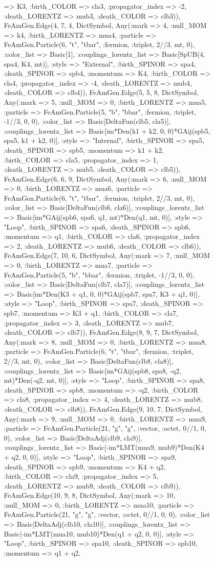 \documentclass{revtex4}
\begin{document}
\begin{figure}[!htb]
\begin{center}
{=> K3, :birth_COLOR => cla3, :propagator_index => -2, :death_LORENTZ => mub3, :death_COLOR => clb3)), FeAmGen.Edge(4, 7, 4, Dict{Symbol, Any}(:mark => 4, :null_MOM => k4, :birth_LORENTZ => mua4, :particle => FeAmGen.Particle(6, "t", "tbar", :fermion, :triplet, 2//3, mt, 0), :color_list => Basic[1], :couplings_lorentz_list => Basic[SpUB(4, spa4, K4, mt)], :style => "External", :birth_SPINOR => spa4, :death_SPINOR => spb4, :momentum => K4, :birth_COLOR => cla4, :propagator_index => -4, :death_LORENTZ => mub4, :death_COLOR => clb4)), FeAmGen.Edge(5, 5, 8, Dict{Symbol, Any}(:mark => 5, :null_MOM => 0, :birth_LORENTZ => mua5, :particle => FeAmGen.Particle(5, "b", "bbar", :fermion, :triplet, -1//3, 0, 0), :color_list => Basic[DeltaFun(clb5, cla5)], :couplings_lorentz_list => Basic[im*Den(k1 + k2, 0, 0)*GAij(spb5, spa5, k1 + k2, 0)], :style => "Internal", :birth_SPINOR => spa5, :death_SPINOR => spb5, :momentum => k1 + k2, :birth_COLOR => cla5, :propagator_index => 1, :death_LORENTZ => mub5, :death_COLOR => clb5)), FeAmGen.Edge(6, 6, 9, Dict{Symbol, Any}(:mark => 6, :null_MOM => 0, :birth_LORENTZ => mua6, :particle => FeAmGen.Particle(6, "t", "tbar", :fermion, :triplet, 2//3, mt, 0), :color_list => Basic[DeltaFun(clb6, cla6)], :couplings_lorentz_list => Basic[im*GAij(spb6, spa6, q1, mt)*Den(q1, mt, 0)], :style => "Loop", :birth_SPINOR => spa6, :death_SPINOR => spb6, :momentum => q1, :birth_COLOR => cla6, :propagator_index => 2, :death_LORENTZ => mub6, :death_COLOR => clb6)), FeAmGen.Edge(7, 10, 6, Dict{Symbol, Any}(:mark => 7, :null_MOM => 0, :birth_LORENTZ => mua7, :particle => FeAmGen.Particle(5, "b", "bbar", :fermion, :triplet, -1//3, 0, 0), :color_list => Basic[DeltaFun(clb7, cla7)], :couplings_lorentz_list => Basic[im*Den(K3 + q1, 0, 0)*GAij(spb7, spa7, K3 + q1, 0)], :style => "Loop", :birth_SPINOR => spa7, :death_SPINOR => spb7, :momentum => K3 + q1, :birth_COLOR => cla7, :propagator_index => 3, :death_LORENTZ => mub7, :death_COLOR => clb7)), FeAmGen.Edge(8, 9, 7, Dict{Symbol, Any}(:mark => 8, :null_MOM => 0, :birth_LORENTZ => mua8, :particle => FeAmGen.Particle(6, "t", "tbar", :fermion, :triplet, 2//3, mt, 0), :color_list => Basic[DeltaFun(clb8, cla8)], :couplings_lorentz_list => Basic[im*GAij(spb8, spa8, -q2, mt)*Den(-q2, mt, 0)], :style => "Loop", :birth_SPINOR => spa8, :death_SPINOR => spb8, :momentum => -q2, :birth_COLOR => cla8, :propagator_index => 4, :death_LORENTZ => mub8, :death_COLOR => clb8)), FeAmGen.Edge(9, 10, 7, Dict{Symbol, Any}(:mark => 9, :null_MOM => 0, :birth_LORENTZ => mua9, :particle => FeAmGen.Particle(21, "g", "g", :vector, :octet, 0//1, 0, 0), :color_list => Basic[DeltaAdj(clb9, cla9)], :couplings_lorentz_list => Basic[-im*LMT(mua9, mub9)*Den(K4 + q2, 0, 0)], :style => "Loop", :birth_SPINOR => spa9, :death_SPINOR => spb9, :momentum => K4 + q2, :birth_COLOR => cla9, :propagator_index => 5, :death_LORENTZ => mub9, :death_COLOR => clb9)), FeAmGen.Edge(10, 9, 8, Dict{Symbol, Any}(:mark => 10, :null_MOM => 0, :birth_LORENTZ => mua10, :particle => FeAmGen.Particle(21, "g", "g", :vector, :octet, 0//1, 0, 0), :color_list => Basic[DeltaAdj(clb10, cla10)], :couplings_lorentz_list => Basic[-im*LMT(mua10, mub10)*Den(q1 + q2, 0, 0)], :style => "Loop", :birth_SPINOR => spa10, :death_SPINOR => spb10, :momentum => q1 + q2, }
\end{center}
\end{figure}
\end{document}
